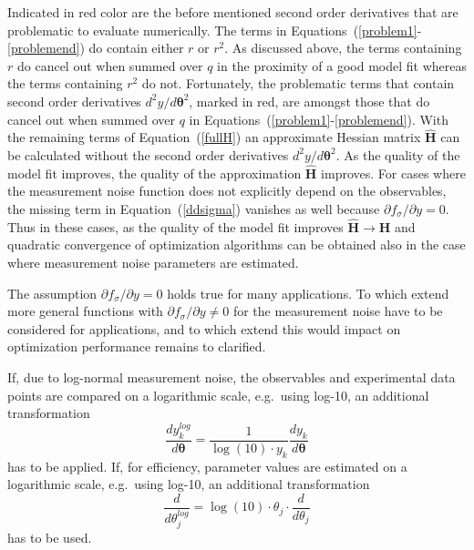 \documentclass[12pt,a4paper]{scrartcl}
\newcommand{\DD}[2]{\frac{d #1}{d #2}}
\begin{document}
Indicated in red color are the before mentioned second order derivatives that are problematic to evaluate numerically. The terms in Equations~(\ref{problem1}-\ref{problemend}) do contain either ${r}$ or  ${r}^2$. As discussed above, the terms containing ${r}$ do cancel out when summed over $q$ in the proximity of a good model fit whereas the terms containing ${r}^2$ do not. Fortunately, the problematic terms that contain second order derivatives $d^2 {y}/d \boldsymbol{\theta}^2$,  marked in red, are amongst those that do cancel out when summed over $q$ in Equations~(\ref{problem1}-\ref{problemend}). With the remaining terms of Equation~(\ref{fullH}) an approximate Hessian matrix $\mathbf{\hat H}$ can be calculated without the second order derivatives $d^2 {y}/d \boldsymbol{\theta}^2$. As the quality of the model fit improves, the quality of the approximation $\mathbf{\hat H}$ improves. For cases where the measurement noise function does not explicitly depend on the observables, the missing term in Equation~(\ref{ddsigma}) vanishes as well because $\partial f_\sigma / \partial y= 0$. Thus in these cases, as the quality of the model fit improves $\mathbf{\hat H} \rightarrow \mathbf{H}$ and quadratic convergence of optimization algorithms can be obtained also in the case where measurement noise parameters are estimated. 

The assumption $\partial f_\sigma / \partial y = 0$ holds true for many applications. To which extend more general functions with $\partial f_\sigma / \partial y \not= 0$ for the measurement noise have to be considered for applications, and to which extend this would impact on optimization performance remains to clarified.

If, due to log-normal measurement noise, the observables and experimental data points are compared on a logarithmic scale, e.g.~using log-10, an additional transformation
\begin{equation}
	\DD{y_k^{log}}{\boldsymbol{\theta}} =  \frac{1}{\log(10) \cdot y_k}\DD{y_k}{\boldsymbol{\theta}}
\end{equation}
has to be applied. 
If, for efficiency, parameter values are estimated on a logarithmic scale, e.g.~using log-10, an additional transformation
\begin{equation}
	\DD{}{\theta_j^{log}} = \log(10)\cdot \theta_j \cdot \DD{}{\theta_j}
\end{equation}
has to be used. 
\end{document}
